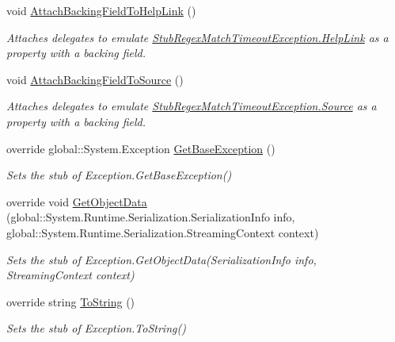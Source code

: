 \begin{DoxyCompactItemize}
void \hyperlink{class_system_1_1_text_1_1_regular_expressions_1_1_fakes_1_1_stub_regex_match_timeout_exception_a9f8b3b2f0c2cc12fc6abaa5dd53fb3fd}{Attach\-Backing\-Field\-To\-Help\-Link} ()
\begin{DoxyCompactList}\small\item\em Attaches delegates to emulate \hyperlink{class_system_1_1_text_1_1_regular_expressions_1_1_fakes_1_1_stub_regex_match_timeout_exception_a99cafbb7c06aa74f30d8027c5bd45fe1}{Stub\-Regex\-Match\-Timeout\-Exception.\-Help\-Link} as a property with a backing field.\end{DoxyCompactList}\item 
void \hyperlink{class_system_1_1_text_1_1_regular_expressions_1_1_fakes_1_1_stub_regex_match_timeout_exception_a13225d79373927b84ad5520bdd596866}{Attach\-Backing\-Field\-To\-Source} ()
\begin{DoxyCompactList}\small\item\em Attaches delegates to emulate \hyperlink{class_system_1_1_text_1_1_regular_expressions_1_1_fakes_1_1_stub_regex_match_timeout_exception_a1d27614b3f4c8e12fdbbba65c8af46a6}{Stub\-Regex\-Match\-Timeout\-Exception.\-Source} as a property with a backing field.\end{DoxyCompactList}\item 
override global\-::\-System.\-Exception \hyperlink{class_system_1_1_text_1_1_regular_expressions_1_1_fakes_1_1_stub_regex_match_timeout_exception_a38cd71e95d6cf297f0ae2c187f860fe1}{Get\-Base\-Exception} ()
\begin{DoxyCompactList}\small\item\em Sets the stub of Exception.\-Get\-Base\-Exception()\end{DoxyCompactList}\item 
override void \hyperlink{class_system_1_1_text_1_1_regular_expressions_1_1_fakes_1_1_stub_regex_match_timeout_exception_afff0bad8e78a172204624ff2c3292ce4}{Get\-Object\-Data} (global\-::\-System.\-Runtime.\-Serialization.\-Serialization\-Info info, global\-::\-System.\-Runtime.\-Serialization.\-Streaming\-Context context)
\begin{DoxyCompactList}\small\item\em Sets the stub of Exception.\-Get\-Object\-Data(\-Serialization\-Info info, Streaming\-Context context)\end{DoxyCompactList}\item 
override string \hyperlink{class_system_1_1_text_1_1_regular_expressions_1_1_fakes_1_1_stub_regex_match_timeout_exception_ad19d692ba65a69484e44def178981ab7}{To\-String} ()
\begin{DoxyCompactList}\small\item\em Sets the stub of Exception.\-To\-String()\end{DoxyCompactList}\end{DoxyCompactItemize}

